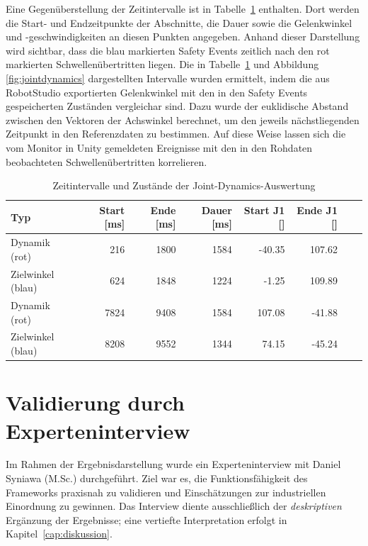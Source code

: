 Eine Gegenüberstellung der Zeitintervalle ist in Tabelle~\ref{tab:jointdynamics} enthalten.
Dort werden die Start- und Endzeitpunkte der Abschnitte, die Dauer sowie die Gelenkwinkel
und -geschwindigkeiten an diesen Punkten angegeben. Anhand dieser Darstellung wird sichtbar,
dass die blau markierten Safety Events zeitlich nach den rot markierten Schwellenübertritten
liegen. Die in Tabelle~\ref{tab:jointdynamics} und Abbildung \ref{fig:jointdynamics} dargestellten Intervalle wurden ermittelt,
indem die aus RobotStudio exportierten Gelenkwinkel mit den in den Safety Events
gespeicherten Zuständen vergleichar sind. Dazu wurde der euklidische Abstand zwischen
den Vektoren der Achswinkel berechnet, um den jeweils nächstliegenden Zeitpunkt in
den Referenzdaten zu bestimmen. Auf diese Weise lassen sich die vom Monitor in Unity
gemeldeten Ereignisse mit den in den Rohdaten beobachteten Schwellenübertritten
korrelieren.

\begin{table}[H]
	\centering
	\small
	\begin{tabularx}{\textwidth}{lrrrrrrX}
		\toprule
		Typ               & Start [ms] & Ende [ms] & Dauer [ms] & Start J1 [\textdegree] & Ende J1 [\textdegree] \\
		\midrule
		Dynamik (rot)     & 216        & 1800      & 1584       & -40.35                 & 107.62                \\
		Zielwinkel (blau) & 624        & 1848      & 1224       & -1.25                  & 109.89                \\
		Dynamik (rot)     & 7824       & 9408      & 1584       & 107.08                 & -41.88                \\
		Zielwinkel (blau) & 8208       & 9552      & 1344       & 74.15                  & -45.24                \\
		\bottomrule
	\end{tabularx}
	\caption{Zeitintervalle und Zustände der Joint-Dynamics-Auswertung}
	\label{tab:jointdynamics}
\end{table}

\section{Validierung durch Experteninterview}

Im Rahmen der Ergebnisdarstellung wurde ein Experteninterview mit Daniel Syniawa
(M.Sc.) durchgeführt. Ziel war es, die
Funktionsfähigkeit des Frameworks praxisnah zu validieren und Einschätzungen zur
industriellen Einordnung zu gewinnen. Das Interview diente ausschließlich der
\emph{deskriptiven} Ergänzung der Ergebnisse; eine vertiefte Interpretation
erfolgt in Kapitel~\ref{cap:diskussion}.

